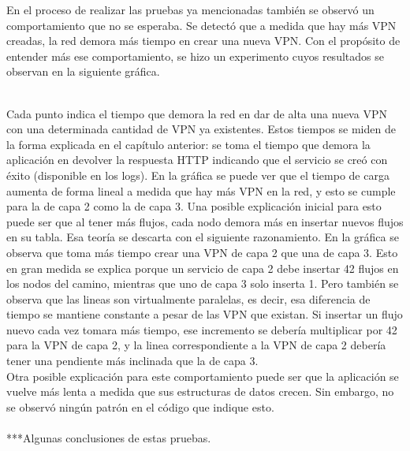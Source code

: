 En el proceso de realizar las pruebas ya mencionadas también se observó un comportamiento que no se esperaba. Se detectó que a medida que hay más VPN creadas, la red demora más tiempo en crear una nueva VPN. Con el propósito de entender más ese comportamiento, se hizo un experimento cuyos resultados se observan en la siguiente gráfica. \\ \\
Cada punto indica el tiempo que demora la red en dar de alta una nueva VPN con una determinada cantidad de VPN ya existentes. Estos tiempos se miden de la forma explicada en el capítulo anterior: se toma el tiempo que demora la aplicación en devolver la respuesta HTTP indicando que el servicio se creó con éxito (disponible en los logs). En la gráfica se puede ver que el tiempo de carga aumenta de forma lineal a medida que hay más VPN en la red, y esto se cumple para la de capa 2 como la de capa 3. Una posible explicación inicial para esto puede ser que al tener más flujos, cada nodo demora más en insertar nuevos flujos en su tabla. Esa teoría se descarta con el siguiente razonamiento. En la gráfica se observa que toma más tiempo crear una VPN de capa 2 que una de capa 3. Esto en gran medida se explica porque un servicio de capa 2 debe insertar 42 flujos en los nodos del camino, mientras que uno de capa 3 solo inserta 1. Pero también se observa que las lineas son virtualmente paralelas, es decir, esa diferencia de tiempo se mantiene constante a pesar de las VPN que existan. Si insertar un flujo nuevo cada vez tomara más tiempo, ese incremento se debería multiplicar por 42 para la VPN de capa 2, y la linea correspondiente a la VPN de capa 2 debería tener una pendiente más inclinada que la de capa 3. \\
Otra posible explicación para este comportamiento puede ser que la aplicación se vuelve más lenta a medida que sus estructuras de datos crecen. Sin embargo, no se observó ningún patrón en el código que indique esto. \\ \\

***Algunas conclusiones de estas pruebas.